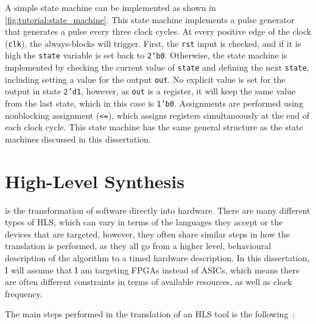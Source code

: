 A simple state machine can be implemented as shown in
\cref{fig:tutorial:state_machine}.  This state machine implements a pulse
generator that generates a pulse every three clock cycles.  At every positive
edge of the clock (\texttt{clk}), the always-blocks will trigger.
First, the \texttt{rst} input is checked, and if it is high the \texttt{state} variable is set back to \texttt{2'b0}.
Otherwise, the state machine is implemented by checking the current value of \texttt{state} and defining the next \texttt{state}, including setting a value for the output \texttt{out}.
No explicit value is set for the output in state \texttt{2'd1}, however, as \texttt{out} is a register, it will keep the same value from the last state, which in this case is \texttt{1'b0}.
Assignments are performed using nonblocking assignment (\texttt{<=}), which assigns registers simultaneously at the end of each clock cycle.
This state machine has the same general structure as the state machines discussed in this dissertation.

\section{High-Level Synthesis}%
\label{sec:bg:hls}

 is the transformation of software directly into hardware.
There are many different types of \gls{HLS}, which can vary in terms of the
languages they accept or the devices that are targeted, however, they often
share similar steps in how the translation is performed, as they all go from a
higher level, behavioural description of the algorithm to a timed hardware
description.  In this dissertation, I will assume that I am targeting
\glspl{FPGA} instead of \glspl{ASIC}, which means there are often different
constraints in terms of available resources, as well as clock frequency.

The main steps performed in the translation of an \gls{HLS} tool is the
following~\cite{coussy09_introd_to_high_level_synth,canis13_l}:

